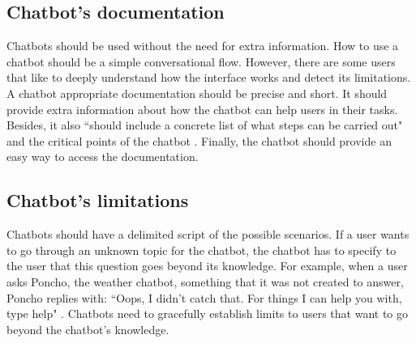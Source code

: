 \documentclass[a4paper,10pt]{article}
\begin{document}

\subsection*{Chatbot's documentation}

Chatbots should be used without the need for extra information. How to use a chatbot should be a simple conversational flow. However, there are some users that like to deeply understand how the interface works and detect its limitations. A chatbot appropriate documentation should be precise and short. It should provide extra information about how the chatbot can help users in their tasks. Besides, it also ``should include a concrete list of what steps can be carried out" and the critical points of the chatbot \cite{HeuristicsWebPage}. Finally, the chatbot should provide an easy way to access the documentation.   

\subsection*{Chatbot's limitations}

Chatbots should have a delimited script of the possible scenarios. If a user wants to go through an unknown topic for the chatbot, the chatbot has to specify to the user that this question goes beyond its knowledge. For example, when a user asks Poncho, the weather chatbot, something that it was not created to answer, Poncho replies with: ``Oops, I didn't catch that. For things I can help you with, type help" \cite{HeuristicsWebPage}. Chatbots need to gracefully establish limits to users that want to go beyond the chatbot's knowledge.  

\medskip


\end{document}
